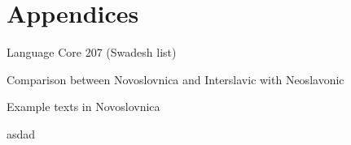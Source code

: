 \chapter{Appendices}

Language Core 207 (Swadesh list)

Comparison between Novoslovnica and Interslavic with Neoslavonic

Example texts in Novoslovnica

\begin{multicols}{2}
	asdad
\end{multicols}